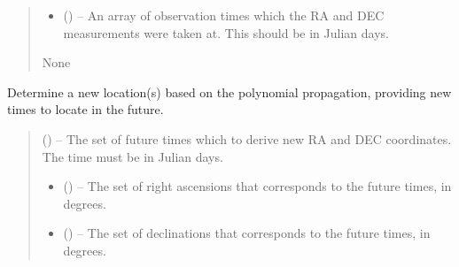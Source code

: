 \documentclass[letterpaper,11pt,english]{sphinxmanual}
\begin{document}
\begin{savenotes}
\begin{fulllineitems}
\begin{savenotes}
\begin{fulllineitems}
\begin{quote}
\begin{description}
\begin{itemize}
\item {} 
\sphinxAtStartPar
{} () – An array of observation times which the RA and DEC measurements
were taken at. This should be in Julian days.

\end{itemize}

\sphinxAtStartPar
None

\end{description}\end{quote}

\end{fulllineitems}\end{savenotes}


\begin{savenotes}\begin{fulllineitems}
\label{\detokenize{code/opihiexarata.propagate.polynomial:opihiexarata.propagate.polynomial.LinearPropagationEngine.forward_propagate}}
\pysigstartsignatures
{}
\pysigstopsignatures
\sphinxAtStartPar
Determine a new location(s) based on the polynomial propagation,
providing new times to locate in the future.
\begin{quote}\begin{description}
\sphinxAtStartPar
{} () – The set of future times which to derive new RA and DEC coordinates.
The time must be in Julian days.

\sphinxAtStartPar
\begin{itemize}
\item {} 
\sphinxAtStartPar
{} () – The set of right ascensions that corresponds to the future times,
in degrees.

\item {} 
\sphinxAtStartPar
{} () – The set of declinations that corresponds to the future times, in
degrees.


\end{itemize}
\end{description}
\end{quote}
\end{fulllineitems}
\end{savenotes}
\end{fulllineitems}
\end{savenotes}
\end{document}
